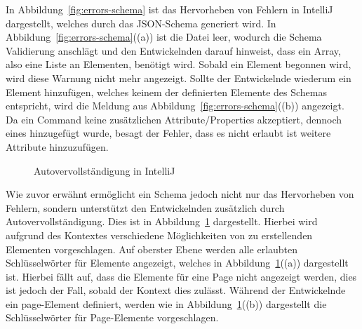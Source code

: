 In Abbildung~\ref{fig:errors-schema} ist das Hervorheben von Fehlern in IntelliJ dargestellt, welches durch das JSON-Schema generiert wird.
In Abbildung~\ref{fig:errors-schema}((a)) ist die Datei leer, wodurch die Schema Validierung anschlägt und den Entwickelnden darauf hinweist, dass ein Array, also eine Liste an Elementen, benötigt wird.
Sobald ein Element begonnen wird, wird diese Warnung nicht mehr angezeigt.
Sollte der Entwickelnde wiederum ein Element hinzufügen, welches keinem der definierten Elemente des Schemas entspricht, wird die Meldung aus Abbildung~\ref{fig:errors-schema}((b)) angezeigt.
Da ein Command keine zusätzlichen Attribute/Properties akzeptiert, dennoch eines hinzugefügt wurde, besagt der Fehler, dass es nicht erlaubt ist weitere Attribute hinzuzufügen.

\begin{figure}%
    \centering
    \qquad
    \caption{Autovervollständigung in IntelliJ}%
    \label{fig:completion-schema}%
\end{figure}

Wie zuvor erwähnt ermöglicht ein Schema jedoch nicht nur das Hervorheben von Fehlern, sondern unterstützt den Entwickelnden zusätzlich durch Autovervollständigung.
Dies ist in Abbildung~\ref{fig:completion-schema} dargestellt.
Hierbei wird aufgrund des Kontextes verschiedene Möglichkeiten von zu erstellenden Elementen vorgeschlagen.
Auf oberster Ebene werden alle erlaubten Schlüsselwörter für Elemente angezeigt, welches in Abbildung~\ref{fig:completion-schema}((a)) dargestellt ist.
Hierbei fällt auf, dass die Elemente für eine Page nicht angezeigt werden, dies ist jedoch der Fall, sobald der Kontext dies zulässt.
Während der Entwickelnde ein page-Element definiert, werden wie in Abbildung~\ref{fig:completion-schema}((b)) dargestellt die Schlüsselwörter für Page-Elemente vorgeschlagen.

